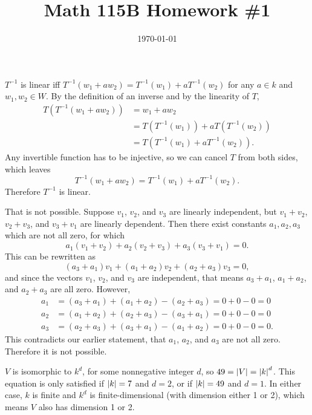 \documentclass{article}
\date{\today}
\title{Math 115B Homework \#1}
\begin{document}
\maketitle

\begin{prob}
\end{prob}
$T^{-1}$ is linear iff $T^{-1}(w_1+a w_2) = T^{-1}(w_1)+ aT^{-1}(w_2)$ for any $a \in k$ and $w_1, w_2 \in W$. By the definition of an inverse and by the linearity of $T$,
\begin{align*}
    T(T^{-1}(w_1+aw_2)) &= w_1+aw_2 \\
                        &= T(T^{-1}(w_1))+a T(T^{-1}(w_2)) \\
                        &= T(T^{-1}(w_1)+aT^{-1}(w_2)).
\end{align*}
Any invertible function has to be injective, so we can cancel $T$ from both sides, which leaves
\[ T^{-1}(w_1+aw_2)=T^{-1}(w_1)+aT^{-1}(w_2). \]
Therefore $T^{-1}$ is linear.

\bigskip
\begin{prob}
\end{prob}
That is not possible. Suppose $v_1$, $v_2$, and $v_3$ are linearly independent, but $v_1+v_2$, $v_2+v_3$, and $v_3+v_1$ are linearly dependent. Then there exist constants $a_1, a_2, a_3$ which are not all zero, for which
\[ a_1(v_1+v_2)+a_2(v_2+v_3)+a_3(v_3+v_1)=0. \]
This can be rewritten as
\[ (a_3+a_1)v_1+(a_1+a_2)v_2+(a_2+a_3)v_3=0, \]
and since the vectors $v_1$, $v_2$, and $v_3$ are independent, that means $a_3+a_1$, $a_1+a_2$, and $a_2+a_3$ are all zero. However,
\begin{align*}
    a_1 &= (a_3+a_1)+(a_1+a_2)-(a_2+a_3)=0+0-0=0 \\
    a_2 &= (a_1+a_2)+(a_2+a_3)-(a_3+a_1)=0+0-0=0 \\
    a_3 &= (a_2+a_3)+(a_3+a_1)-(a_1+a_2)=0+0-0=0.
\end{align*}
This contradicts our earlier statement, that $a_1$, $a_2$, and $a_3$ are not all zero. Therefore it is not possible.

\bigskip
\begin{prob}
\end{prob}
$V$ is isomorphic to $k^d$, for some nonnegative integer $d$, so $49=\left\lvert V \right\rvert=\left\lvert k \right\rvert^d$. This equation is only satisfied if $\left\lvert k \right\rvert=7$ and $d=2$, or if $\left\lvert k \right\rvert=49$ and $d=1$. In either case, $k$ is finite and $k^d$ is finite-dimensional (with dimension either 1 or 2), which means $V$ also has dimension 1 or 2.
\end{document}
